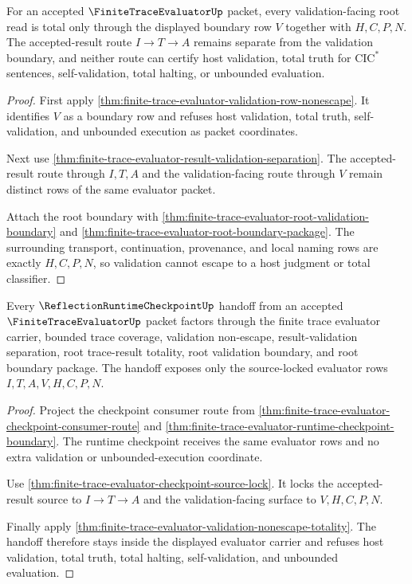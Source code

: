 \begin{theorem}
\label{thm:finite-trace-evaluator-validation-nonescape-totality}
For an accepted $\FiniteTraceEvaluatorUp$ packet, every validation-facing root
read is total only through the displayed boundary row $V$ together with
$H,C,P,N$. The accepted-result route $I \to T \to A$ remains separate from the
validation boundary, and neither route can certify host validation, total truth
for $\mathrm{CIC}^{*}$ sentences, self-validation, total halting, or unbounded
evaluation.
\end{theorem}
\begin{proof}
First apply \autoref{thm:finite-trace-evaluator-validation-row-nonescape}. It
identifies $V$ as a boundary row and refuses host validation, total truth,
self-validation, and unbounded execution as packet coordinates.

Next use \autoref{thm:finite-trace-evaluator-result-validation-separation}.
The accepted-result route through $I,T,A$ and the validation-facing route
through $V$ remain distinct rows of the same evaluator packet.

Attach the root boundary with
\autoref{thm:finite-trace-evaluator-root-validation-boundary} and
\autoref{thm:finite-trace-evaluator-root-boundary-package}. The surrounding
transport, continuation, provenance, and local naming rows are exactly
$H,C,P,N$, so validation cannot escape to a host judgment or total classifier.
\end{proof}

\begin{theorem}
\label{thm:finite-trace-evaluator-runtime-boundary-handoff}
Every $\ReflectionRuntimeCheckpointUp$ handoff from an accepted
$\FiniteTraceEvaluatorUp$ packet factors through the finite trace evaluator
carrier, bounded trace coverage, validation non-escape, result-validation
separation, root trace-result totality, root validation boundary, and root
boundary package. The handoff exposes only the source-locked evaluator rows
$I,T,A,V,H,C,P,N$.
\end{theorem}
\begin{proof}
Project the checkpoint consumer route from
\autoref{thm:finite-trace-evaluator-checkpoint-consumer-route} and
\autoref{thm:finite-trace-evaluator-runtime-checkpoint-boundary}. The runtime
checkpoint receives the same evaluator rows and no extra validation or
unbounded-execution coordinate.

Use \autoref{thm:finite-trace-evaluator-checkpoint-source-lock}. It locks the
accepted-result source to $I \to T \to A$ and the validation-facing surface to
$V,H,C,P,N$.

Finally apply
\autoref{thm:finite-trace-evaluator-validation-nonescape-totality}. The handoff
therefore stays inside the displayed evaluator carrier and refuses host
validation, total truth, total halting, self-validation, and unbounded
evaluation.
\end{proof}
